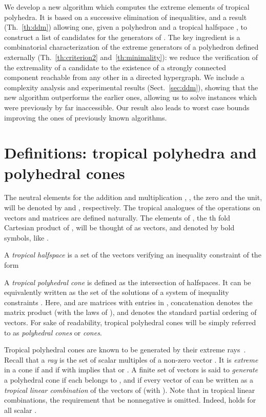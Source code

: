 \documentclass[proceedings]{stacs}
\begin{document}
\medskip{}
We develop a new algorithm which computes the extreme elements of tropical polyhedra. It is based on a successive elimination of inequalities, and 
a result (Th.~\ref{th:ddm}) allowing one, given a polyhedron  and a tropical halfspace , to construct
a list of candidates for the generators of .
The key ingredient is a combinatorial characterization of the extreme generators
of a polyhedron defined externally (Th.~\ref{th:criterion2} and~\ref{th:minimality}): we reduce the verification of the extremality of a candidate to the existence of a strongly connected component reachable from any other in a directed hypergraph. 
We include a complexity analysis and experimental results (Sect.~\ref{sec:ddm}),
showing that the new algorithm outperforms the earlier ones, allowing us to solve instances which were previously by far inaccessible. Our result
also leads to worst case bounds improving the ones of previously known algorithms. 


\section{Definitions: tropical polyhedra and polyhedral cones}\label{sec:definition}
The neutral elements for the addition  and multiplication , \ie{}, the zero and the unit, will be denoted by  and , respectively.
The tropical analogues of the operations on vectors and matrices are
defined naturally. The elements of , 
the th fold Cartesian product of ,
will be thought of as vectors, and denoted by bold symbols, 
like .

A \emph{tropical halfspace} is a set of the vectors  verifying an inequality constraint of the form 

A \emph{tropical polyhedral cone} is 
defined as the intersection of  halfspaces. It can be equivalently written as the set of the solutions of a system of inequality constraints .
Here,  and  are  matrices with entries in , concatenation denotes the matrix product (with the laws of ), and  denotes
the standard partial ordering of vectors. For sake of readability, tropical polyhedral cones will be simply referred to as \emph{polyhedral cones} or \emph{cones}.



Tropical polyhedral cones are known to be generated by their extreme rays~\cite{GK06a,GK,BSS}. 
Recall that a {\em ray} is the set of scalar multiples of a non-zero vector . It is {\em extreme} in a cone  if  and if  with  implies that  or . A finite set  of vectors is said to {\em generate} a polyhedral cone  if each
 belongs to , and if every vector  of 
can be written as a \emph{tropical linear combination}  of the vectors
of  (with ). Note that in tropical linear combinations, the requirement that  be nonnegative is omitted. Indeed,  holds for all scalar .
\end{document}
